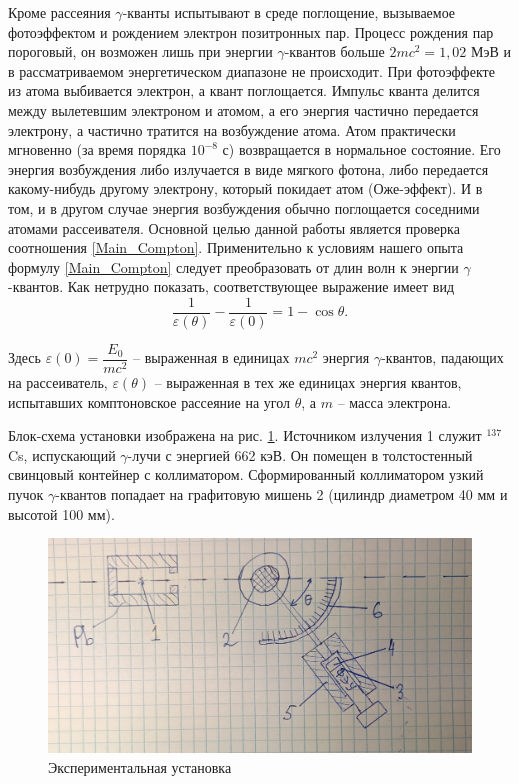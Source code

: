  
 	Кроме рассеяния $\gamma$-кванты испытывают в среде поглощение, вызываемое фотоэффектом и рождением электрон позитронных пар. Процесс рождения пар пороговый, он возможен лишь при энергии $\gamma$-квантов больше $2mc^2 = 1,02$ МэВ и в рассматриваемом энергетическом диапазоне не происходит. При фотоэффекте из атома выбивается электрон, а квант поглощается. Импульс кванта делится между вылетевшим электроном и атомом, а его энергия частично передается электрону, а частично тратится на возбуждение атома. Атом практически мгновенно (за время порядка $10^{-8}$ с) возвращается в нормальное состояние. Его энергия возбуждения либо излучается в виде мягкого фотона, либо передается какому-нибудь другому электрону, который покидает атом (Оже-эффект). И в том, и в другом случае энергия возбуждения обычно поглощается соседними атомами рассеивателя. Основной целью данной работы является проверка соотношения \eqref{Main_Compton}. Применительно к условиям нашего опыта формулу \eqref{Main_Compton} следует преобразовать от длин волн к энергии $\gamma$-квантов. Как нетрудно показать, соответствующее выражение имеет вид
 	\begin{equation}
 		\frac{1}{\varepsilon(\theta)} - \frac{1}{\varepsilon(0)} = 1 - \cos\theta.
 		\label{Energy_Compton}
 	\end{equation}

 
 	Здесь $\varepsilon(0) = \dfrac{E_0}{mc^2}$ -- выраженная в единицах $mc^2$ энергия $\gamma$-квантов, падающих на рассеиватель, $\varepsilon(\theta)$ -- выраженная в тех же единицах энергия квантов, испытавших комптоновское рассеяние на угол $\theta$, а $m$ -- масса электрона.
 	
 	
 	
 	
 	Блок-схема установки изображена на рис. \ref{Scheme_Compton}. Источником излучения 1 служит $^{137}$Cs, испускающий $\gamma$-лучи с энергией 662 кэВ. Он помещен в толстостенный свинцовый контейнер с коллиматором. Сформированный коллиматором узкий пучок $\gamma$-квантов попадает на графитовую мишень 2 (цилиндр диаметром 40 мм и высотой 100 мм).

 	
 	\begin{figure}[h!]
 		\centering
 		\includegraphics[width=\linewidth]{Pictures/Scheme.jpg}
 		\caption{Экспериментальная установка}
 		\label{Scheme_Compton}
 	\end{figure}
 
